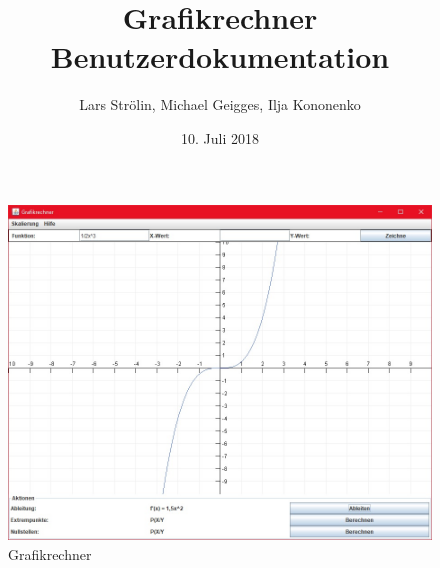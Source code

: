 \documentclass[11pt]{article}
\begin{document}
\begin{titlepage}

\author{Lars Strölin, Michael Geigges, Ilja Kononenko} 
\title{Grafikrechner Benutzerdokumentation} 
\date{10. Juli 2018} 
\maketitle

\setcounter{page}{1}

\begin{figure}[ht]
	\centering
	\includegraphics[width=1.0\textwidth]{Bilder/GR_1.jpg}
	\caption{Grafikrechner}
\end{figure}

\end{titlepage}


\tableofcontents
\newpage







\printindex
\end{document}
